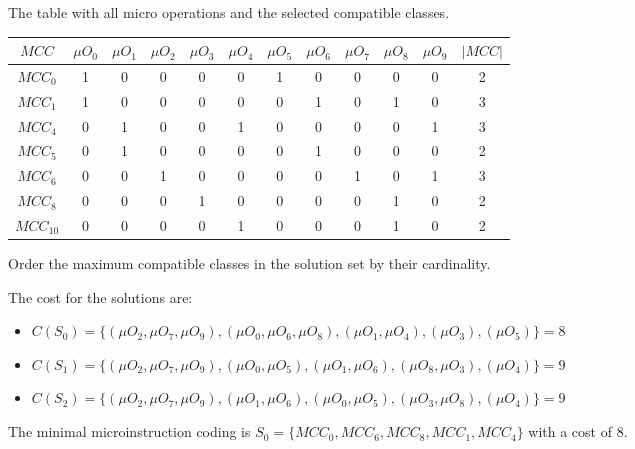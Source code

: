The table with all micro operations and the selected compatible classes.
\begin{table}[H]
    \centering
        \begin{tabular}{|c|c|c|c|c|c|c|c|c|c|c|c|}
            \hline
            $MCC$ & $\mu O_{0}$ & $\mu O_{1}$ & $\mu O_{2}$ & $\mu O_{3}$ & $\mu O_{4}$ & $\mu O_{5}$ & $\mu O_{6}$ & $\mu O_{7}$ & $\mu O_{8}$ & $\mu O_{9}$ & $|MCC|$ \\ \hline
            $MCC_{0}$ & 1 & 0 & 0 & 0 & 0 & 1 & 0 & 0 & 0 & 0 & 2\\ \hline
            $MCC_{1}$ & 1 & 0 & 0 & 0 & 0 & 0 & 1 & 0 & 1 & 0 & 3\\ \hline
            $MCC_{4}$ & 0 & 1 & 0 & 0 & 1 & 0 & 0 & 0 & 0 & 1 & 3\\ \hline
            $MCC_{5}$ & 0 & 1 & 0 & 0 & 0 & 0 & 1 & 0 & 0 & 0 & 2\\ \hline
            $MCC_{6}$ & 0 & 0 & 1 & 0 & 0 & 0 & 0 & 1 & 0 & 1 & 3\\ \hline
            $MCC_{8}$ & 0 & 0 & 0 & 1 & 0 & 0 & 0 & 0 & 1 & 0 & 2\\ \hline
            $MCC_{10}$ & 0 & 0 & 0 & 0 & 1 & 0 & 0 & 0 & 1 & 0 & 2\\ \hline
        \end{tabular}
\end{table}
Order the maximum compatible classes in the solution set by their cardinality.

The cost for the solutions are:
\begin{itemize}
    \item $C(S_{0}) = \{ (\mu O_{2}, \mu O_{7}, \mu O_{9}), (\mu O_{0}, \mu O_{6}, \mu O_{8}), (\mu O_{1}, \mu O_{4}), (\mu O_{3}), (\mu O_{5}) \} = 8$
    \item $C(S_{1}) = \{ (\mu O_{2}, \mu O_{7}, \mu O_{9}), (\mu O_{0}, \mu O_{5}), (\mu O_{1}, \mu O_{6}), (\mu O_{8}, \mu O_{3}), (\mu O_{4})  \} = 9$
    \item $C(S_{2}) = \{ (\mu O_{2}, \mu O_{7}, \mu O_{9}), (\mu O_{1}, \mu O_{6}), (\mu O_{0}, \mu O_{5}), (\mu O_{3}, \mu O_{8}), (\mu O_{4}) \} = 9$
\end{itemize}

The minimal microinstruction coding is $S_{0} = \{MCC_{0}, MCC_{6}, MCC_{8}, MCC_{1}, MCC_{4}\}$ with a cost of 8.